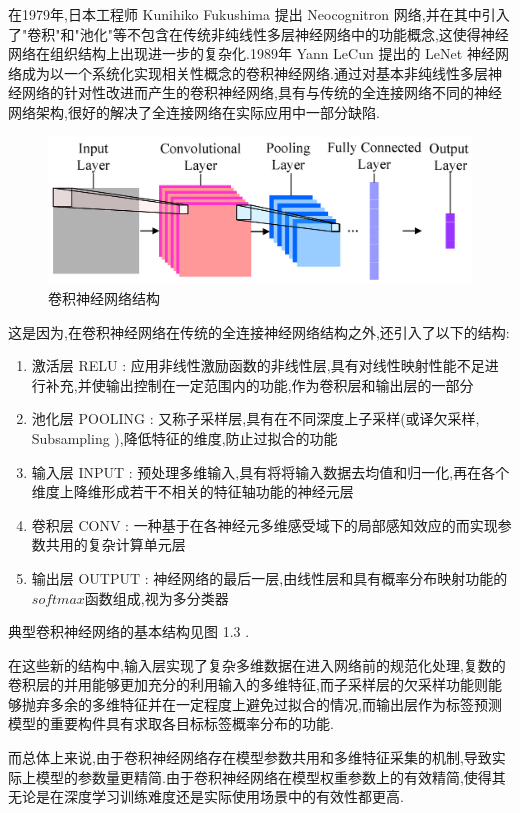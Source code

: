 在1979年,日本工程师 Kunihiko Fukushima 提出 Neocognitron 网络,并在其中引入了"卷积"和"池化"等不包含在传统非纯线性多层神经网络中的功能概念,这使得神经网络在组织结构上出现进一步的复杂化.1989年 Yann LeCun 提出的 LeNet 神经网络成为以一个系统化实现相关性概念的卷积神经网络.通过对基本非纯线性多层神经网络的针对性改进而产生的卷积神经网络,具有与传统的全连接网络不同的神经网络架构,很好的解决了全连接网络在实际应用中一部分缺陷.

\begin{figure}[H]
\centering
\includegraphics[scale=1]{Figures/CNN3.png}
\caption{卷积神经网络结构}
\end{figure}

这是因为,在卷积神经网络在传统的全连接神经网络结构之外,还引入了以下的结构:
\begin{enumerate}
	\item 激活层 RELU : 应用非线性激励函数的非线性层,具有对线性映射性能不足进行补充,并使输出控制在一定范围内的功能,作为卷积层和输出层的一部分
	\item 池化层 POOLING : 又称子采样层,具有在不同深度上子采样(或译欠采样, Subsampling ),降低特征的维度,防止过拟合的功能
	\item 输入层 INPUT : 预处理多维输入,具有将将输入数据去均值和归一化,再在各个维度上降维形成若干不相关的特征轴功能的神经元层
	\item 卷积层 CONV : 一种基于在各神经元多维感受域下的局部感知效应的而实现参数共用的复杂计算单元层
	\item 输出层 OUTPUT : 神经网络的最后一层,由线性层和具有概率分布映射功能的$softmax$函数组成,视为多分类器
\end{enumerate}

典型卷积神经网络的基本结构见图 1.3 .

在这些新的结构中,输入层实现了复杂多维数据在进入网络前的规范化处理,复数的卷积层的并用能够更加充分的利用输入的多维特征,而子采样层的欠采样功能则能够抛弃多余的多维特征并在一定程度上避免过拟合的情况,而输出层作为标签预测模型的重要构件具有求取各目标标签概率分布的功能.

而总体上来说,由于卷积神经网络存在模型参数共用和多维特征采集的机制,导致实际上模型的参数量更精简.由于卷积神经网络在模型权重参数上的有效精简,使得其无论是在深度学习训练难度还是实际使用场景中的有效性都更高.

